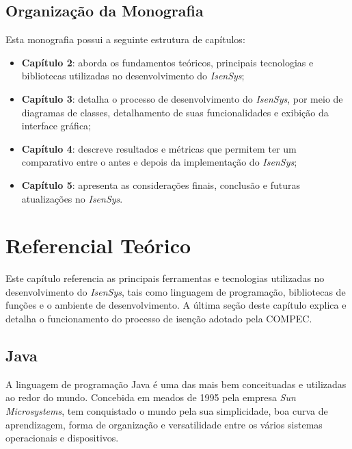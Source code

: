 \documentclass[
	12pt,			%
	openright,		%
	oneside,	
	a4paper,		%
	english,		%
	brazil			%
]{abntex2/abntex2}  %
\begin{document}
		\section{Organização da Monografia}
		
			Esta monografia possui a seguinte estrutura de capítulos:
			
			\begin{itemize}
				
				\item \textbf{Capítulo 2}: aborda os fundamentos teóricos, principais tecnologias e bibliotecas utilizadas no desenvolvimento do \textit{IsenSys};
				\item \textbf{Capítulo 3}: detalha o processo de desenvolvimento do \textit{IsenSys}, por meio de diagramas de classes, detalhamento de suas funcionalidades e exibição da interface gráfica;
				\item \textbf{Capítulo 4}: descreve resultados e métricas que permitem ter um comparativo entre o antes e depois da implementação do \textit{IsenSys};
				\item \textbf{Capítulo 5}: apresenta as considerações finais, conclusão e futuras atualizações no \textit{IsenSys}.
				
			\end{itemize}
	
	\chapter{Referencial Teórico} \label{cap2-referencial}
	
		Este capítulo referencia as principais ferramentas e tecnologias utilizadas no desenvolvimento do \textit{IsenSys}, tais como linguagem de programação, bibliotecas de funções e o ambiente de desenvolvimento. A última seção deste capítulo explica e detalha o funcionamento do processo de isenção adotado pela COMPEC.
		
		\section{Java} \label{java}
		
			A linguagem de programação Java \cite{java} é uma das mais bem conceituadas e utilizadas ao redor do mundo. Concebida em meados de 1995 pela empresa \textit{Sun Microsystems}, tem conquistado o mundo pela sua simplicidade, boa curva de aprendizagem, forma de organização e versatilidade entre os vários sistemas operacionais e dispositivos.
		
\end{document}
